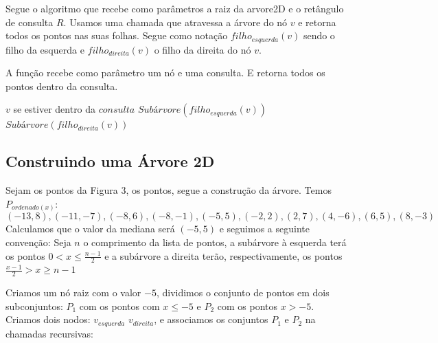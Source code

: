 Segue o algoritmo que recebe como parâmetros a raiz da arvore2D e o retângulo de consulta \(R\).
Usamos uma chamada  que atravessa a árvore do nó \(v\) e retorna
todos os pontos nas suas folhas. Segue como notação \(filho_{esquerda}(v)\) sendo o filho da esquerda e
\(filho_{direita}(v)\) o filho da direita do nó \(v\).


\begin{algorithm}[H]
    \caption{A função  recebe como parâmetro um nó e uma 
    consulta.
     E retorna todos os pontos dentro da consulta.}
    \begin{algorithmic}[1]
        \Return  $v$ se estiver dentro da $consulta$
        \Else
            \State \Return $Subárvore( filho_{esquerda}(v) )$
            \Else
                \State {}
                \EndIf
            \EndIf
            \State \Return $Subárvore(filho_{direita}(v))$
            \Else
                \State {}
                \EndIf
            \EndIf
        \EndIf
    \EndFunction
    \end{algorithmic}
\end{algorithm}

\subsection{Construindo uma Árvore 2D}
Sejam os pontos da Figura 3, os pontos, segue a construção da árvore.
Temos $P_{ordenado(x)}$:
\[
    (-13,8), (-11,-7), (-8,6), (-8,-1), (-5,5), (-2, 2), (2,7), (4,-6),(6,5),(8,-3)
\]
Calculamos que o valor da mediana será $(-5,5)$ e seguimos a seguinte convenção:
Seja $n$ o comprimento da lista de pontos, a subárvore à esquerda terá os pontos $0 < x \leq 
\frac{n-1}{2}$ e a subárvore a direita terão, respectivamente, os pontos $ \frac{x-1}{2} > x \geq n -1$

Criamos um nó raiz com o valor $-5$, dividimos o conjunto de pontos em dois subconjuntos: $P_1$ 
com os pontos com $x \leq -5$ e $P_2$ com os pontos $x > -5$.
Criamos dois nodos: $v_{esquerda}$ $v_{direita}$, e associamos os conjuntos $P_1$ e $P_2$ na chamadas
recursivas: 

